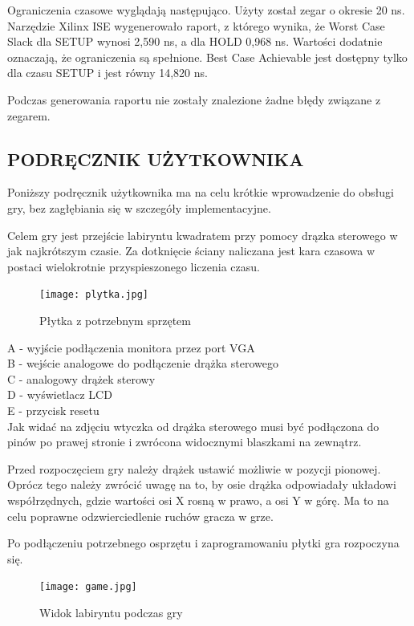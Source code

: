 \documentclass[11pt]{article}
\begin{document}
\vspace{1em}

Ograniczenia czasowe wyglądają następująco.
Użyty został zegar o okresie 20 ns.
Narzędzie Xilinx ISE wygenerowało raport, z którego wynika, że Worst Case Slack dla SETUP wynosi 2,590 ns, a dla HOLD 0,968 ns.
Wartości dodatnie oznaczają, że ograniczenia są spełnione.
Best Case Achievable jest dostępny tylko dla czasu SETUP i jest równy 14,820 ns.

Podczas generowania raportu nie zostały znalezione żadne błędy związane z zegarem.

\subsection{PODRĘCZNIK UŻYTKOWNIKA}

Poniższy podręcznik użytkownika ma na celu krótkie wprowadzenie do obsługi gry, bez zagłębiania się w szczegóły implementacyjne.

Celem gry jest przejście labiryntu kwadratem przy pomocy drązka sterowego w jak najkrótszym czasie. Za dotknięcie ściany naliczana jest kara czasowa w postaci wielokrotnie przyspieszonego liczenia czasu.

\begin{figure}[H]
\centering
\texttt{[image: plytka.jpg]}
\caption{Płytka z potrzebnym sprzętem}
\end{figure}

\noindent
A - wyjście podłączenia monitora przez port VGA \\
B - wejście analogowe do podłączenie drążka sterowego \\
C - analogowy drążek sterowy \\
D - wyświetlacz LCD \\
E - przycisk resetu \\

Jak widać na zdjęciu wtyczka od drążka sterowego musi być podłączona do pinów po prawej stronie i zwrócona widocznymi blaszkami na zewnątrz.

Przed rozpoczęciem gry należy drążek ustawić możliwie w pozycji pionowej.
Oprócz tego należy zwrócić uwagę na to, by osie drążka odpowiadały układowi współrzędnych, gdzie wartości osi X rosną w prawo, a osi Y w górę.
Ma to na celu poprawne odzwierciedlenie ruchów gracza w grze.

Po podłączeniu potrzebnego osprzętu i zaprogramowaniu płytki gra rozpoczyna się. 

\begin{figure}[H]
\centering
\texttt{[image: game.jpg]}
\caption{Widok labiryntu podczas gry}
\end{figure}
\end{document}
